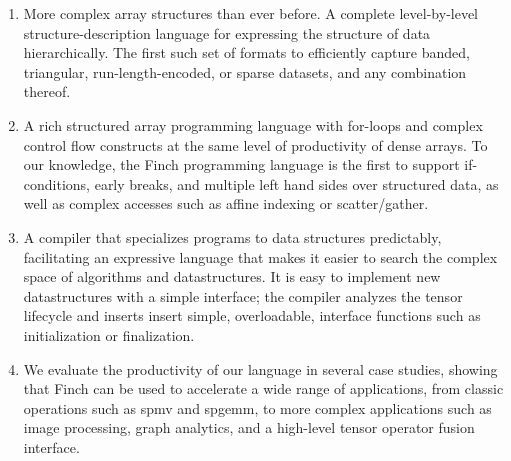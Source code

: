 \documentclass[acmsmall]{acmart}
\begin{document}
\begin{enumerate}
\item More complex array structures than ever before. A complete level-by-level
structure-description language for expressing the structure of data
hierarchically. The first such set of formats to efficiently capture banded,
triangular, run-length-encoded, or sparse datasets, and any combination thereof.
\item A rich structured array programming language with for-loops
and complex control flow constructs at the same level of productivity
of dense arrays. To our knowledge, the Finch programming language is the first
to support if-conditions, early breaks, and multiple left hand sides over
structured data, as well as complex accesses such as affine indexing or scatter/gather.
\item A compiler that specializes programs to data structures 
predictably, facilitating an expressive language that makes it easier to search the complex
space of algorithms and datastructures. It is easy to implement new datastructures with a simple interface; the compiler analyzes the tensor lifecycle and inserts insert simple, overloadable, interface functions such as
initialization or finalization.
\item We evaluate the productivity of our language in several case studies,
showing that Finch can be used to accelerate a wide range of applications, 
from classic operations such as spmv and spgemm, to more complex applications such as image processing, graph analytics, and a high-level tensor operator fusion interface.

\end{enumerate}
\end{document}
